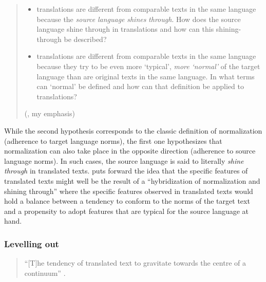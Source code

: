 \begin{quote}
\begin{itemize} 
	\item translations are different from comparable texts in the same language because the \textit{source} \textit{language} \textit{shines} \textit{through}. How does the source language shine through in translations and how can this shining-through be described?
	\item translations are different from comparable texts in the same language because they try to be even more ‘typical’, \textit{more} \textit{‘normal’} of the target language than are original texts in the same language. In what terms can ‘normal’ be defined and how can that definition be applied to translations?
\end{itemize}
\hfill(\citealt[61--62]{teich_cross-linguistic_2003}, my emphasis)
\end{quote}

While the second hypothesis corresponds to the classic definition of normalization (adherence to target language norms), the first one hypothesizes that normalization can also take place in the opposite direction (adherence to source language norms). In such cases, the source language is said to literally \textit{shine} \textit{through} in translated texts. \citet[136]{kranich_between_2011} puts forward the idea that the specific features of translated texts might well be the result of a “hybridization of normalization and shining through” where the specific features observed in translated texts would hold a balance between a tendency to conform to the norms of the target text and a propensity to adopt features that are typical for the source language at hand.

\subsubsection{Levelling out}
\label{sec:2.2.2.4}  
\begin{quote}
“[T]he tendency of translated text to gravitate towards the centre of a continuum” \citep[184]{baker_corpus-based_1996}.
\end{quote}


